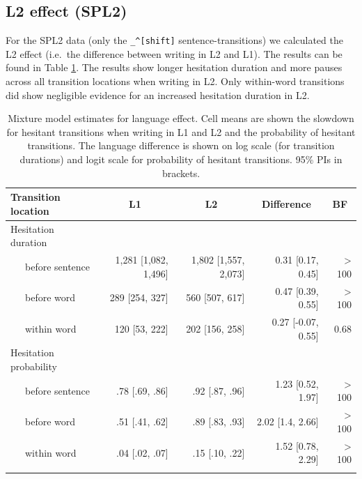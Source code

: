 \documentclass[
  english,
  man,floatsintext]{apa7}
\begin{document}
\begin{appendix}
\section{}
\hypertarget{l2-effect-spl2}{%
\subsection{L2 effect (SPL2)}\label{l2-effect-spl2}}

For the SPL2 data (only the \texttt{\_\^{}{[}shift{]}}
sentence-transitions) we calculated the L2 effect (i.e.~the difference
between writing in L2 and L1). The results can be found in Table
\ref{tab:l2effect}. The results show longer hesitation duration and more
pauses across all transition locations when writing in L2. Only
within-word transitions did show negligible evidence for an increased
hesitation duration in L2.

\begin{table}[b]

\begin{center}
\begin{threeparttable}

\caption{\label{tab:l2effect}Mixture model estimates for language effect. Cell means are shown the slowdown for hesitant transitions when writing in L1 and L2 and the probability of hesitant transitions. The language difference is shown on log scale (for transition durations) and logit scale for probability of hesitant transitions. 95\% PIs in brackets.}

\small{

\begin{tabular}{lrrrr}
\toprule
Transition location & \multicolumn{1}{c}{L1} & \multicolumn{1}{c}{L2} & \multicolumn{1}{c}{Difference} & \multicolumn{1}{c}{BF}\\
\midrule
Hesitation duration &  &  &  & \\
\ \ \ before sentence & 1,281 [1,082, 1,496] & 1,802 [1,557, 2,073] & 0.31 [0.17, 0.45] & > 100\\
\ \ \ before word & 289 [254, 327] & 560 [507, 617] & 0.47 [0.39, 0.55] & > 100\\
\ \ \ within word & 120 [53, 222] & 202 [156, 258] & 0.27 [-0.07, 0.55] & 0.68\\
Hesitation probability &  &  &  & \\
\ \ \ before sentence & .78 [.69, .86] & .92 [.87, .96] & 1.23 [0.52, 1.97] & > 100\\
\ \ \ before word & .51 [.41, .62] & .89 [.83, .93] & 2.02 [1.4, 2.66] & > 100\\
\ \ \ within word & .04 [.02, .07] & .15 [.10, .22] & 1.52 [0.78, 2.29] & > 100\\
\bottomrule
\addlinespace
\end{tabular}

}
\end{threeparttable}
\end{center}
\end{table}
\end{appendix}
\end{document}
